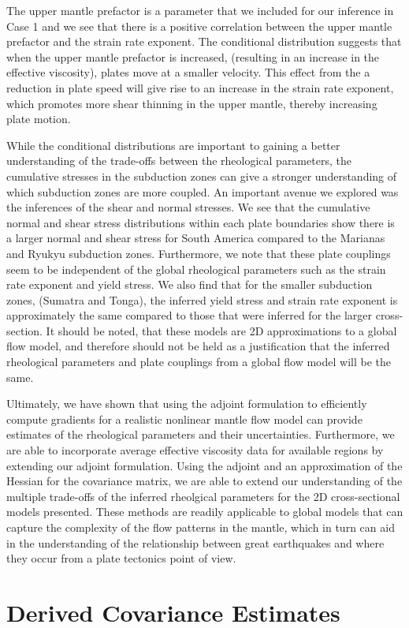 \documentclass[12pt]{article}
\begin{document}
The upper mantle prefactor is a parameter that we included for our inference in Case 1 and we see that there is a positive correlation between the upper mantle prefactor and the strain rate exponent. The conditional distribution suggests that when the upper mantle prefactor is increased, (resulting in an increase in the effective viscosity), plates move at a smaller velocity. This  effect from the a reduction in plate speed will give rise to an increase in the strain rate exponent, which promotes more shear thinning in the upper mantle, thereby increasing plate motion.


While the conditional distributions are important to gaining a better understanding of the trade-offs between the rheological parameters, the cumulative stresses in the subduction zones can give a stronger understanding of which subduction zones are more coupled. An important avenue we explored was the inferences of the shear and normal stresses. We see that the cumulative normal and shear stress distributions within each plate boundaries show there is a larger normal and shear stress for South America compared to the Marianas and Ryukyu subduction zones. Furthermore, we note that these plate couplings seem to be independent of the global rheological parameters such as the strain rate exponent and yield stress.  We also find that for the smaller subduction zones, (Sumatra and Tonga), the inferred yield stress and strain rate exponent is approximately the same compared to those that were inferred for the larger cross-section. It should be noted, that these models are 2D approximations to a global flow model, and therefore should not be held as a justification that the inferred rheological parameters and plate couplings from a global flow model will be the same.

Ultimately, we have shown that using the adjoint formulation to efficiently compute gradients for a realistic nonlinear mantle flow model can provide estimates of the rheological parameters and their uncertainties. Furthermore, we are able to incorporate average effective viscosity data for available regions by extending our adjoint formulation. Using the adjoint and an approximation of the Hessian for the covariance matrix, we are able to extend our understanding of the multiple trade-offs of the inferred rheolgical parameters for the 2D cross-sectional models presented. These methods are readily applicable to global models that can capture the complexity of the flow patterns in the mantle, which in turn can aid in the understanding of the relationship between great earthquakes and where they occur from a plate tectonics point of view.

\appendix
\section{Derived Covariance Estimates}


\end{document}
